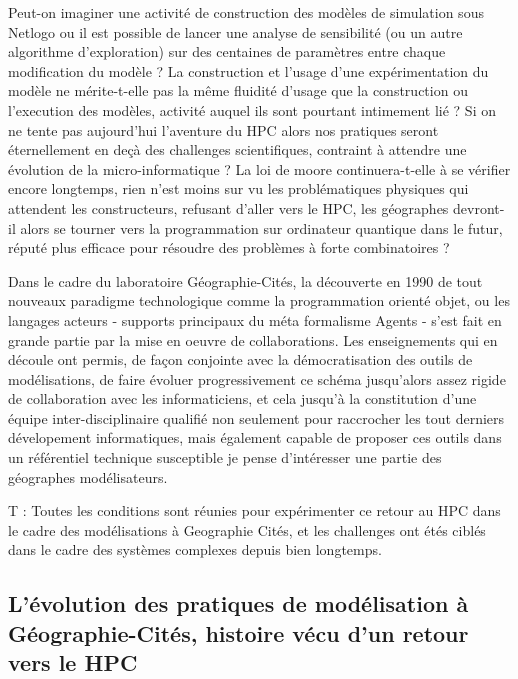 Peut-on imaginer une activité de construction des modèles de simulation sous Netlogo ou il est possible de lancer une analyse de sensibilité (ou un autre algorithme d'exploration) sur des centaines de paramètres entre chaque modification du modèle ? La construction et l'usage d'une expérimentation du modèle ne mérite-t-elle pas la même fluidité d'usage que la construction ou l'execution des modèles, activité auquel ils sont pourtant intimement lié ? Si on ne tente pas aujourd'hui l'aventure du HPC alors nos pratiques seront éternellement en deçà des challenges scientifiques, contraint à attendre une évolution de la micro-informatique ? La loi de moore continuera-t-elle à se vérifier encore longtemps, rien n'est moins sur vu les problématiques physiques qui attendent les constructeurs, refusant d'aller vers le HPC, les géographes devront-il alors se tourner vers la programmation sur ordinateur quantique dans le futur, réputé plus efficace pour résoudre des problèmes à forte combinatoires ?

Dans le cadre du laboratoire Géographie-Cités, la découverte en 1990 de tout nouveaux paradigme technologique comme la programmation orienté objet, ou les langages acteurs - supports principaux du méta formalisme Agents - s'est fait en grande partie par la mise en oeuvre de collaborations. Les enseignements qui en découle ont permis, de façon conjointe avec la démocratisation des outils de modélisations, de faire évoluer progressivement ce schéma jusqu'alors assez rigide de collaboration avec les informaticiens, et cela jusqu’à la constitution d’une équipe inter-disciplinaire qualifié non seulement pour raccrocher les tout derniers dévelopement informatiques, mais également capable de proposer ces outils dans un référentiel technique susceptible je pense d'intéresser une partie des géographes modélisateurs.

T : Toutes les conditions sont réunies pour expérimenter ce retour au HPC dans le cadre des modélisations à Geographie Cités, et les challenges ont étés ciblés dans le cadre des systèmes complexes depuis bien longtemps.

\subsection{L'évolution des pratiques de modélisation à Géographie-Cités, histoire vécu d'un retour vers le HPC}
\label{ssec:hist_pratiques}


